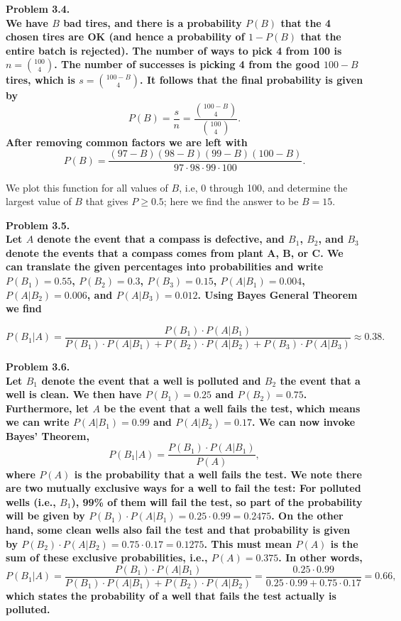 \noindent
\bf{Problem 3.4.} \\

We have $B$ bad tires, and there is a probability $P(B)$ that the
4 chosen tires are OK (and hence a probability of $1-P(B)$ that the entire batch is rejected).
The number of ways to pick 4 from 100 is $n = \binom{100}{4}$.  The number of
successes is picking 4 from the good $100-B$ tires, which is $s = \binom{100 - B}{4}$.
It follows that the final probability is given by
\[
P(B) = \frac{s}{n} = \frac{\binom{100 - B}{4}}{\binom{100}{4}}.
\]
After removing common factors we are left with
\[
P(B) = \frac{(97-B)(98-B)(99-B)(100-B)}{97\cdot98\cdot99\cdot100}.
\]

We plot this function for all values of $B$, i.e, 0 through 100, and determine
the largest value of $B$ that gives $P \ge 0.5$; here we find the answer to be $B = 15$.


\noindent
\bf{Problem 3.5.} \\

Let $A$ denote the event that a compass is defective, and $B_1$, $B_2$, and $B_3$ denote
the events that a compass comes from plant A, B, or C.  We can translate the given percentages into
probabilities and write $P(B_1) = 0.55$, $P(B_2) = 0.3$, $P(B_3) = 0.15$, $P(A|B_1) = 0.004$,
$P(A|B_2) = 0.006$, and $P(A|B_3) = 0.012$.  Using Bayes General Theorem we find

\[
P(B_1|A) = \frac{P(B_1)\cdot P(A|B_1)}{P(B_1)\cdot P(A|B_1) + P(B_2)\cdot P(A|B_2) + P(B_3)\cdot P(A|B_3)} \approx 0.38.
\]

\noindent
\bf{Problem 3.6.} \\

Let $B_1$ denote the event that a well is polluted and $B_2$ the event that a well is clean.  We then have
$P(B_1) = 0.25$ and $P(B_2) = 0.75$.  Furthermore, let $A$ be the event that a well fails the test,
which means we can write $P(A|B_1) = 0.99$ and $P(A|B_2) = 0.17$.  We can now invoke Bayes' Theorem,
$$
P(B_1|A) = \frac{P(B_1)\cdot P(A|B_1)}{P(A)},
$$
where $P(A)$ is the probability that a well fails the test.  We note there are two mutually exclusive ways
for a well to fail the test: For polluted wells (i.e., $B_1$), 99\% of them will fail the test, so part of
the probability will be given by $P(B_1)\cdot P(A|B_1) = 0.25\cdot 0.99 = 0.2475$.  On the other hand, some
clean wells also fail the test and that probability is given by $P(B_2)\cdot P(A|B_2) = 0.75\cdot 0.17 = 0.1275$.
This must mean $P(A)$ is the sum of these exclusive probabilities, i.e., $P(A) = 0.375$.  In other words,
$$
P(B_1|A) = \frac{P(B_1)\cdot P(A|B_1)}{P(B_1)\cdot P(A|B_1) + P(B_2)\cdot P(A|B_2)} = \frac{0.25\cdot 0.99}{0.25\cdot 0.99 + 0.75\cdot 0.17} = 0.66,
$$
which states the probability of a well that fails the test actually is polluted.
\\

